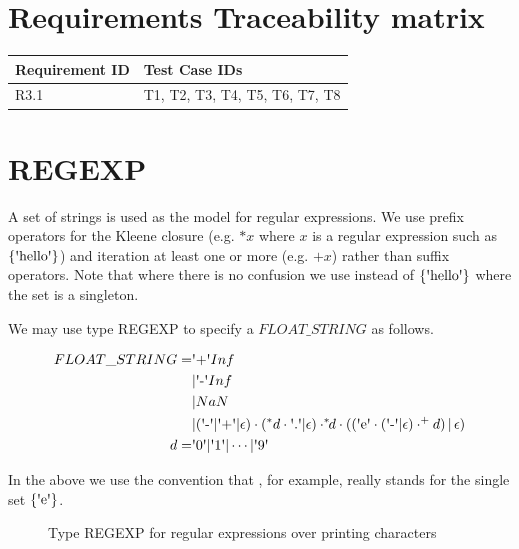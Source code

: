 \documentclass[runningheads,12pt]{article}
\begin{document}
\section{Requirements Traceability matrix}

\begin{tabular}{|p{1.5in}|p{3.5in}|}
\hline
\textbf{Requirement ID}	 & \textbf{Test Case IDs}\\ 
\hline
R3.1 & T1, T2, T3, T4, T5, T6, T7, T8\\
\hline
\end{tabular}




\newpage
\appendix

\section{REGEXP}


A set of strings is used as the model for regular expressions. We use prefix operators for the Kleene closure (e.g. $*x$ where $x$ is a regular expression such as $\{\squote{hello}\}$) and iteration at least one or more (e.g. $\textrm{+}x$) rather than suffix operators. Note that where there is no confusion we use  instead of $\{\squote{hello}\}$ where the set is a singleton. 

We may use type REGEXP to specify a $FLOAT\_STRING$ as follows.

\begin{align}
FLOAT\_STRING = &\squote{+}Inf\\
&|\squote{-}Inf\\
&|NaN\\
&|(\squote{-}|\squote{+}|\epsilon)\cdot(^*d\cdot\squote{.}|\epsilon)\cdot
	^*\!\!d\cdot ((\squote{e}\cdot(\squote{-}|\epsilon)\cdot^\textrm{+}d)\,|\,\epsilon)\\
d = &\squote{0} | \squote{1} | \cdots |\squote{9} 
\end{align}

In the above we use the convention that , for example, really stands for the single set $\{\squote{e}\}$.


\begin{figure} [H]

\caption{Type REGEXP for regular expressions over printing characters}
\end{figure}

\end{document}
